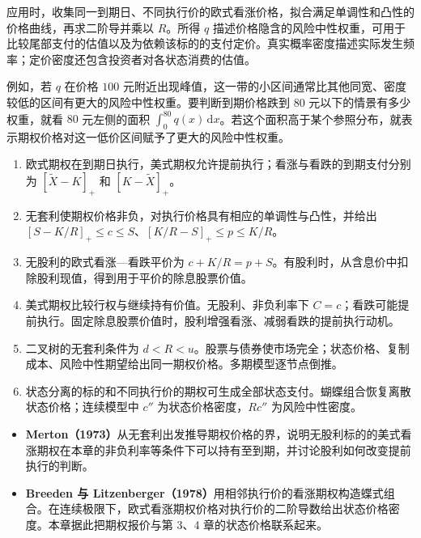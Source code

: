 应用时，收集同一到期日、不同执行价的欧式看涨价格，拟合满足单调性和凸性的价格曲线，再求二阶导并乘以 $R$。所得 $q$ 描述价格隐含的风险中性权重，可用于比较尾部支付的估值以及为依赖该标的的支付定价。真实概率密度描述实际发生频率；定价密度还包含投资者对各状态消费的估值。

\begin{samepage}
例如，若 $q$ 在价格 $100$ 元附近出现峰值，这一带的小区间通常比其他同宽、密度较低的区间有更大的风险中性权重。要判断到期价格跌到 $80$ 元以下的情景有多少权重，就看 $80$ 元左侧的面积 $\int_0^{80}q(x)\,\mathrm dx$。若这个面积高于某个参照分布，就表示期权价格对这一低价区间赋予了更大的风险中性权重。\par
\end{samepage}

\WJChapterSummary
\begin{tcolorbox}[summary]
\begin{enumerate}
 \item 欧式期权在到期日执行，美式期权允许提前执行；看涨与看跌的到期支付分别为 $[\tilde X-K]_+$ 和 $[K-\tilde X]_+$。
 \item 无套利使期权价格非负，对执行价格具有相应的单调性与凸性，并给出 $[S-K/R]_+\le c\le S$、$[K/R-S]_+\le p\le K/R$。
 \item 无股利的欧式看涨—看跌平价为 $c+K/R=p+S$。有股利时，从含息价中扣除股利现值，得到用于平价的除息股票价值。
 \item 美式期权比较行权与继续持有价值。无股利、非负利率下 $C=c$；看跌可能提前执行。固定除息股票价值时，股利增强看涨、减弱看跌的提前执行动机。
 \item 二叉树的无套利条件为 $d<R<u$。股票与债券使市场完全；状态价格、复制成本、风险中性期望给出同一期权价格。多期模型逐节点倒推。
 \item 状态分离的标的和不同执行价的期权可生成全部状态支付。蝴蝶组合恢复离散状态价格；连续模型中 $c''$ 为状态价格密度，$Rc''$ 为风险中性密度。
\end{enumerate}
\end{tcolorbox}

\begin{tcolorbox}[knowledge,breakable=false,title={参考文献与本章贡献}]
\begin{itemize}
 \item \textbf{Merton（1973）}从无套利出发推导期权价格的界，说明无股利标的的美式看涨期权在本章的非负利率等条件下可以持有至到期，并讨论股利如何改变提前执行的判断。
 \item \textbf{Breeden 与 Litzenberger（1978）}用相邻执行价的看涨期权构造蝶式组合。在连续极限下，欧式看涨期权价格对执行价的二阶导数给出状态价格密度。本章据此把期权报价与第 3、4 章的状态价格联系起来。
\end{itemize}
\end{tcolorbox}

